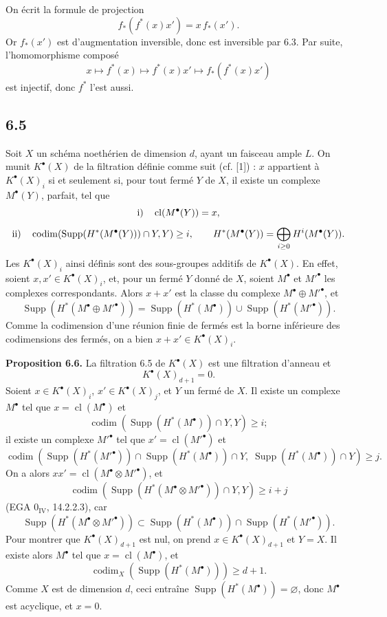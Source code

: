 \documentclass[11pt]{article}
\providecommand{\codim}{\operatorname{codim}}
\providecommand{\Supp}{\operatorname{Supp}}
\providecommand{\codim}{\operatorname{codim}}
\begin{document}
On écrit la formule de projection
\[
  f_*(f^*(x)x')=x\,f_*(x').
\]
Or \(f_*(x')\) est d'augmentation inversible, donc est inversible par 6.3. Par suite, l'homomorphisme composé
\[
  x\longmapsto f^*(x)\longmapsto f^*(x)x'\longmapsto f_*(f^*(x)x')
\]
est injectif, donc \(f^*\) l'est aussi.

\subsection*{6.5}
Soit \(X\) un schéma noethérien de dimension \(d\), ayant un faisceau ample \(L\). On munit \(K^\bullet(X)\) de la filtration définie comme suit (cf. [1]) : \(x\) appartient à \(K^\bullet(X)_i\) si et seulement si, pour tout fermé \(Y\) de \(X\), il existe un complexe \(M^\bullet(Y)\), parfait, tel que
\[
  \text{\rm i)}\quad \operatorname{cl}(M^\bullet(Y))=x,
\]
\[
  \text{\rm ii)}\quad
  \codim(\Supp(H^*(M^\bullet(Y)))\cap Y,Y)\geq i,
  \qquad
  H^*(M^\bullet(Y))=\bigoplus_{i\geq0}H^i(M^\bullet(Y)).
\]
Les \(K^\bullet(X)_i\) ainsi définis sont des sous-groupes additifs de \(K^\bullet(X)\). En effet, soient \(x,x'\in K^\bullet(X)_i\), et, pour un fermé \(Y\) donné de \(X\), soient \(M^\bullet\) et \(M'^\bullet\) les complexes correspondants. Alors \(x+x'\) est la classe du complexe \(M^\bullet\oplus M'^\bullet\), et
\[
  \Supp(H^*(M^\bullet\oplus M'^\bullet))
  =
  \Supp(H^*(M^\bullet))\cup\Supp(H^*(M'^\bullet)).
\]
Comme la codimension d'une réunion finie de fermés est la borne inférieure des codimensions des fermés, on a bien \(x+x'\in K^\bullet(X)_i\).

\textbf{Proposition 6.6.} La filtration 6.5 de \(K^\bullet(X)\) est une filtration d'anneau et
\[
  K^\bullet(X)_{d+1}=0.
\]
Soient \(x\in K^\bullet(X)_i\), \(x'\in K^\bullet(X)_j\), et \(Y\) un fermé de \(X\). Il existe un complexe \(M^\bullet\) tel que \(x=\operatorname{cl}(M^\bullet)\) et
\[
  \codim(\Supp(H^*(M^\bullet))\cap Y,Y)\geq i;
\]
il existe un complexe \(M'^\bullet\) tel que \(x'=\operatorname{cl}(M'^\bullet)\) et
\[
  \codim(\Supp(H^*(M'^\bullet))\cap\Supp(H^*(M^\bullet))\cap Y,\;
          \Supp(H^*(M^\bullet))\cap Y)\geq j.
\]
On a alors \(xx'=\operatorname{cl}(M^\bullet\otimes M'^\bullet)\), et
\[
  \codim(\Supp(H^*(M^\bullet\otimes M'^\bullet))\cap Y,Y)\geq i+j
\]
(EGA \(0_{\mathrm{IV}}\), 14.2.2.3), car
\[
  \Supp(H^*(M^\bullet\otimes M'^\bullet))
  \subset
  \Supp(H^*(M^\bullet))\cap\Supp(H^*(M'^\bullet)).
\]
Pour montrer que \(K^\bullet(X)_{d+1}\) est nul, on prend \(x\in K^\bullet(X)_{d+1}\) et \(Y=X\). Il existe alors \(M^\bullet\) tel que \(x=\operatorname{cl}(M^\bullet)\), et
\[
  \codim_X(\Supp(H^*(M^\bullet)))\geq d+1.
\]
Comme \(X\) est de dimension \(d\), ceci entraîne \(\Supp(H^*(M^\bullet))=\varnothing\), donc \(M^\bullet\) est acyclique, et \(x=0\).
\end{document}

